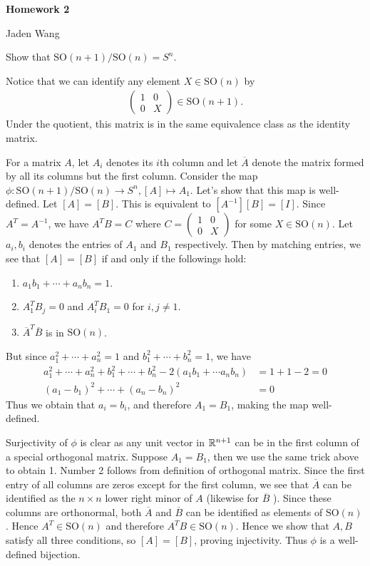 \documentclass[12pt]{article}
\begin{document}
\centerline {\textsf{\textbf{\LARGE{Homework 2}}}}
\centerline {Jaden Wang}
\vspace{.15in}
\begin{problem}[5]
Show that $ \text{SO}( n+1) / \text{SO}( n) = S^{n}$.

Notice that we can identify any element $ X \in \text{SO}( n) $ by
\begin{align*}
	\begin{pmatrix} 1& 0 \\ 0 & X \end{pmatrix} \in \text{SO}(n+1) .
\end{align*}
Under the quotient, this matrix is in the same equivalence class as the identity matrix.

For a matrix $ A$, let  $ A_i$ denotes its $ i$th column and let $ \overline{A}$ denote the matrix formed by all its columns but the first column. Consider the map $ \phi: \text{SO}(n+1) / \text{SO}(n) \to S^{n}, [A] \mapsto A_1$. Let's show that this map is well-defined. Let $ [A]=[B]$. This is equivalent to $ [A^{-1}][B] = [I]$. Since $ A^{T}= A^{-1}$, we have $ A^{T}B = C$ where $ C = \begin{pmatrix} 1&0\\0& X \end{pmatrix} $ for some $ X \in \text{SO}( n) $. Let $ a_i,b_i$ denotes the entries of $ A_1$ and $ B_1$ respectively. Then by matching entries, we see that $ [A]=[B]$ if and only if the followings hold:
\begin{enumerate}[label=(\arabic*)]
	\item $ a_1b_1 + \cdots + a_n b_n =1 $.
	\item $ A_1^{T} B_j = 0$ and $ A_i^{T}B_1 =0$ for $ i,j \neq 1$.
	\item $ \overline{A} ^{T} \overline{B}$ is in $ \text{SO}( n) $.
\end{enumerate}
But since $ a_1^2+ \cdots + a_n^2 = 1$ and $ b_1^2+ \cdots + b_n^2 = 1$, we have
\begin{align*}
	a_1^2 + \cdots + a_n^2 + b_1^2+ \cdots + b_n^2 - 2(a_1b_1 + \cdots a_nb_n) &= 1+1-2 =0 \\
	(a_1-b_1)^2 + \cdots + (a_n - b_n)^2 &= 0 
\end{align*}
Thus we obtain that $ a_i = b_i$, and therefore $ A_1 = B_1$, making the map well-defined.

Surjectivity of $ \phi$ is clear as any unit vector in $ \mathbb{R}^{n+1}$ can be in the first column of a special orthogonal matrix. Suppose $ A_1 = B_1$, then we use the same trick above to obtain 1. Number 2 follows from definition of orthogonal matrix. Since the first entry of all columns are zeros except for the first column, we see that $ \overline{A}$ can be identified as the $ n \times n$ lower right minor of $ A$ (likewise for $ \overline{B}$ ). Since these columns are orthonormal, both $ \overline{A}$ and $ \overline{B}$ can be identified as elements of $ \text{SO}( n) $. Hence $ A^{T} \in \text{SO}( n) $ and therefore $ A^{T} B \in \text{SO}( n) $. Hence we show that $ A,B$ satisfy all three conditions, so  $ [A] = [B]$, proving injectivity. Thus  $ \phi$ is a well-defined bijection.

\end{problem}
\end{document}
